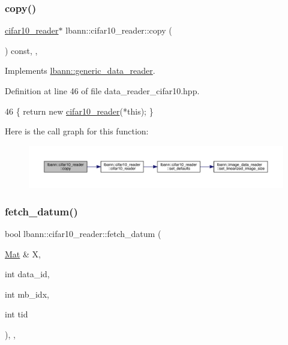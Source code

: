 \subsubsection{\texorpdfstring{copy()}{copy()}}
{\footnotesize\ttfamily \hyperlink{classlbann_1_1cifar10__reader}{cifar10\+\_\+reader}$\ast$ lbann\+::cifar10\+\_\+reader\+::copy (\begin{DoxyParamCaption}{ }\end{DoxyParamCaption}) const\hspace{0.3cm}{\ttfamily [inline]}, {\ttfamily [override]}, {\ttfamily [virtual]}}



Implements \hyperlink{classlbann_1_1generic__data__reader_a208ba1223e7aaa75e94b728501f12f86}{lbann\+::generic\+\_\+data\+\_\+reader}.



Definition at line 46 of file data\+\_\+reader\+\_\+cifar10.\+hpp.


\begin{DoxyCode}
46 \{ \textcolor{keywordflow}{return} \textcolor{keyword}{new} \hyperlink{classlbann_1_1cifar10__reader_a3e4fca66c9bd38798e56379d4a2cd6c0}{cifar10\_reader}(*\textcolor{keyword}{this}); \}
\end{DoxyCode}
Here is the call graph for this function\+:\nopagebreak
\begin{figure}[H]
\begin{center}
\leavevmode
\includegraphics[width=350pt]{classlbann_1_1cifar10__reader_a32206d0f0f7baf2471ed589ec4db356b_cgraph}
\end{center}
\end{figure}
\mbox{\label{classlbann_1_1cifar10__reader_a590c672731bbdcb6e7fd8fd300d004d5}} 
\subsubsection{\texorpdfstring{fetch\+\_\+datum()}{fetch\_datum()}}
{\footnotesize\ttfamily bool lbann\+::cifar10\+\_\+reader\+::fetch\+\_\+datum (\begin{DoxyParamCaption}\item[{\hyperlink{base_8hpp_a68f11fdc31b62516cb310831bbe54d73}{Mat} \&}]{X,  }\item[{int}]{data\+\_\+id,  }\item[{int}]{mb\+\_\+idx,  }\item[{int}]{tid }\end{DoxyParamCaption})\hspace{0.3cm}{\ttfamily [override]}, {\ttfamily [protected]}, {\ttfamily [virtual]}}

